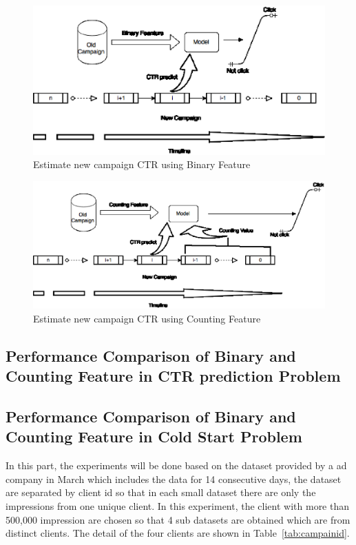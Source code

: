 \documentclass{sig-alternate}
\begin{document}
\begin{figure}[h]
\centering
\includegraphics[width=\columnwidth]{binaryrepresent.eps}
\caption{Estimate new campaign CTR using Binary Feature}
\label{fig:binary}
\end{figure}

\begin{figure}[h]
\centering
\includegraphics[width=\columnwidth]{counting.eps}
\caption{Estimate new campaign CTR using Counting Feature}
\label{fig:counting}
\end{figure}


\subsection{Performance Comparison of Binary and Counting Feature in CTR prediction Problem}

\subsection{Performance Comparison of Binary and Counting Feature in Cold Start Problem}

In this part, the experiments will be done based on the dataset provided by a ad company in March which includes the data for 14 consecutive days, the dataset are separated by client id so that in each small dataset there are only the impressions from one unique client. In this experiment, the client with more than 500,000 impression are chosen so that 4 sub datasets are obtained which are from distinct clients. The detail of the four clients are shown in Table~\ref{tab:campainid}.
\end{document}
